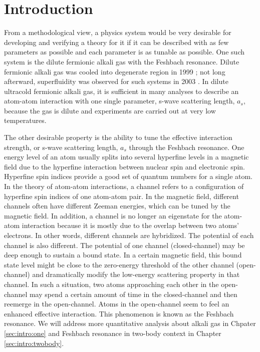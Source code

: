 
\chapter{Introduction}
From  a methodological view, a physics system  would be very desirable for developing and  verifying a theory for it if  it can be described with  as few parameters as possible and  each parameter  is as tunable as possible. One such system is the dilute fermionic alkali gas with the Feshbach resonance.  Dilute fermionic alkali gas was cooled into degenerate region in 1999 \cite{DeMarco1999}; not long afterward,  superfluidity was observed for such systems in 2003 \cite{Regal2003}.  In dilute ultracold fermionic alkali gas, it is sufficient in many analyses to describe an atom-atom interaction with one single parameter, s-wave scattering length, $a_{s}$, because the gas is dilute and experiments are carried out at very low temperatures.       

The other desirable property is the ability to  tune the effective interaction strength, or s-wave scattering length, $a_{s}$ through the Feshbach resonance.  One energy level of an atom  usually splits into several hyperfine levels in a magnetic field  due to the hyperfine interaction between nuclear spin and electronic spin. Hyperfine spin indices provide a good set of quantum numbers for a single atom.  In the theory of  atom-atom interactions, a channel refers to a  configuration of hyperfine spin indices of one atom-atom pair. In the magnetic field, different channels often have different Zeeman energies, which can be tuned by the magnetic field.  In addition, a channel is no longer an eigenstate for the atom-atom interaction because it is mostly due to the overlap between two atoms' electrons.  In other words, different channels are hybridized.  The potential of each channel is also different.  The potential of one  channel (closed-channel) may be deep enough to sustain a bound state.  In a certain magnetic field,  this bound state level might be close to the zero-energy threshold of the other channel (open-channel) and  dramatically modify the low-energy scattering property in that channel.   In such a situation, two atoms approaching each other in the open-channel may spend a certain amount of time in the closed-channel and then reemerge in the open-channel.  Atoms in the open-channel seem to feel an enhanced effective interaction.  This phenomenon is known as the Feshbach resonance.    We will address more quantitative analysis about alkali gas in Chpater \ref{sec:intro:one} and Feshbach resonance in two-body context in Chapter \ref{sec:intro:twobody}. 




